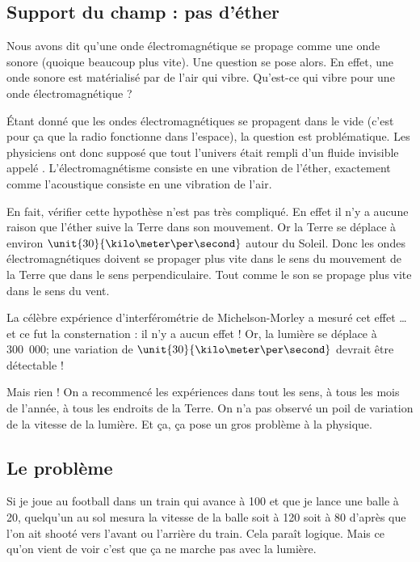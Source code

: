 \subsection{Support du champ : pas d'éther}

Nous avons dit qu'une onde électromagnétique se propage comme une onde sonore (quoique beaucoup plus vite). Une question se pose alors. En effet, une onde sonore est matérialisé par de l'air qui vibre. Qu'est-ce qui vibre pour une onde électromagnétique ?

Étant donné que les ondes électromagnétiques se propagent dans le vide (c'est pour ça que la radio fonctionne dans l'espace), la question est problématique. Les physiciens ont donc supposé que tout l'univers était rempli d'un fluide invisible appelé . L'électromagnétisme consiste en une vibration de l'éther, exactement comme l'acoustique consiste en une vibration de l'air.

En fait, vérifier cette hypothèse n'est pas très compliqué. En effet il n'y a aucune raison que l'éther suive la Terre dans son mouvement. Or la Terre se déplace à environ $\unit{30}{\kilo\meter\per\second}$ autour du Soleil. Donc les ondes électromagnétiques doivent se propager plus vite dans le sens du mouvement de la Terre que dans le sens perpendiculaire. Tout comme le son se propage plus vite dans le sens du vent.

La célèbre expérience d'interférométrie de Michelson-Morley\cite{BIBooJSDSooIUhMQQ} a mesuré cet effet \ldots et ce fut la consternation : il n'y a aucun effet ! Or, la lumière se déplace à \unit{300.000}{\kilo\meter\per\second}; une variation de $\unit{30}{\kilo\meter\per\second}$ devrait être détectable !

Mais rien ! On a recommencé les expériences dans tout les sens, à tous les mois de l'année, à tous les endroits de la Terre. On n'a pas observé un poil de variation de la vitesse de la lumière. Et ça, ça pose un gros problème à la physique.


\subsection{Le problème}

Si je joue au football dans un train qui avance à \unit{100}{\kilo\meter\per\hour} et que je lance une balle à \unit{20}{\kilo\meter\per\hour}, quelqu'un au sol mesura la vitesse de la balle soit à \unit{120}{\kilo\meter\per\hour} soit à \unit{80}{\kilo\meter\per\hour} d'après que l'on ait shooté vers l'avant ou l'arrière du train. Cela paraît logique. Mais ce qu'on vient de voir c'est que ça ne marche pas avec la lumière.

